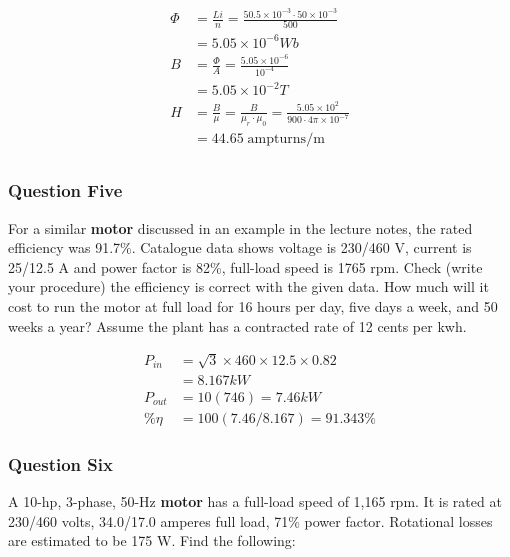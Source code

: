 \documentclass[a4paper,11pt]{article}
\begin{document}
\begin{align*}
    \Phi & = \frac{Li}{n} = \frac{50.5\times10^{-3} \cdot 50 \times 10^{-3}}{500}                                \\&= 5.05\times10^{-6}Wb\\
    B    & = \frac{\Phi}{A} = \frac{5.05\times10^{-6}}{10^{-4}}                                                  \\
         & = 5.05\times10^{-2}T                                                                                  \\
    H    & = \frac{B}{\mu} = \frac{B}{\mu_r \cdot \mu_0} = \frac{5.05\times10^{2}}{900 \cdot 4\pi\times 10^{-7}} \\
         & = 44.65 \; \mathrm{ampturns/m}                                                                        \\
\end{align*}

\subsubsection*{Question Five}
For a similar \textbf{motor} discussed in an example in the lecture notes, the rated efficiency was 91.7\%. Catalogue data shows voltage is 230/460 V, current is 25/12.5 A and power factor is 82\%, full-load speed is 1765 rpm. Check (write your procedure) the efficiency is correct with the given data. How much will it cost to run the motor at full load for 16 hours per day, five days a week, and 50 weeks a year? Assume the plant has a contracted rate of 12 cents per kwh.

\begin{align*}
    P_{in}  & =\sqrt{3}\times460\times12.5\times0.82 \\
            & = 8.167kW                              \\
    P_{out} & = 10(746) = 7.46kW                     \\
    \%\eta  & = 100(7.46/8.167)=91.343\%
\end{align*}

\subsubsection*{Question Six}

A 10-hp, 3-phase, 50-Hz \textbf{motor} has a full-load speed of 1,165 rpm. It is rated at 230/460 volts, 34.0/17.0 amperes full load, 71\% power factor. Rotational losses are estimated to be 175 W. Find the following:
\end{document}
